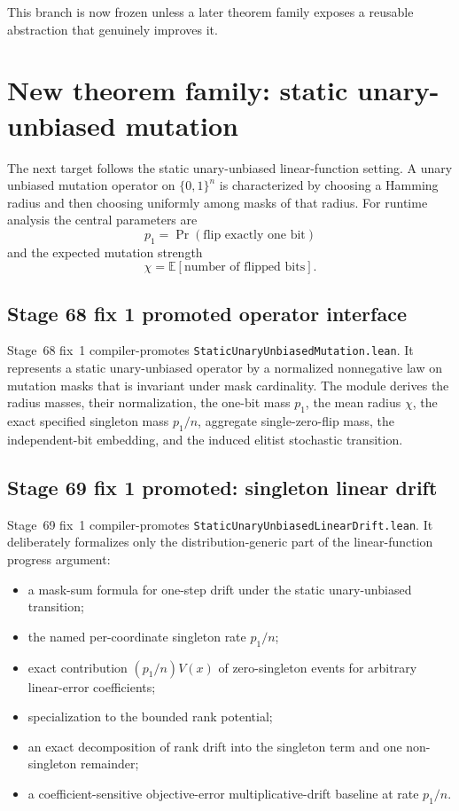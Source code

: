 \documentclass[11pt]{article}
\begin{document}
This branch is now frozen unless a later theorem family exposes a reusable abstraction
that genuinely improves it.

\section{New theorem family: static unary-unbiased mutation}

The next target follows the static unary-unbiased linear-function setting. A unary
unbiased mutation operator on $\{0,1\}^n$ is characterized by choosing a Hamming radius
and then choosing uniformly among masks of that radius. For runtime analysis the central
parameters are
\[
  p_1=\Pr(\text{flip exactly one bit})
\]
and the expected mutation strength
\[
  \chi=\mathbb E[\text{number of flipped bits}].
\]

\subsection{Stage 68 fix 1 promoted operator interface}

Stage~68 fix~1 compiler-promotes \texttt{StaticUnaryUnbiasedMutation.lean}. It represents
a static unary-unbiased operator by a normalized nonnegative law on mutation masks that
is invariant under mask cardinality. The module derives the radius masses, their
normalization, the one-bit mass $p_1$, the mean radius $\chi$, the exact specified
singleton mass $p_1/n$, aggregate single-zero-flip mass, the independent-bit embedding,
and the induced elitist stochastic transition.

\subsection{Stage 69 fix 1 promoted: singleton linear drift}

Stage~69 fix~1 compiler-promotes \texttt{StaticUnaryUnbiasedLinearDrift.lean}. It deliberately formalizes
only the distribution-generic part of the linear-function progress argument:
\begin{itemize}[nosep]
  \item a mask-sum formula for one-step drift under the static unary-unbiased transition;
  \item the named per-coordinate singleton rate $p_1/n$;
  \item exact contribution $(p_1/n)V(x)$ of zero-singleton events for arbitrary
        linear-error coefficients;
  \item specialization to the bounded rank potential;
  \item an exact decomposition of rank drift into the singleton term and one
        non-singleton remainder;
  \item a coefficient-sensitive objective-error multiplicative-drift baseline at rate
        $p_1/n$.
\end{itemize}
\end{document}
